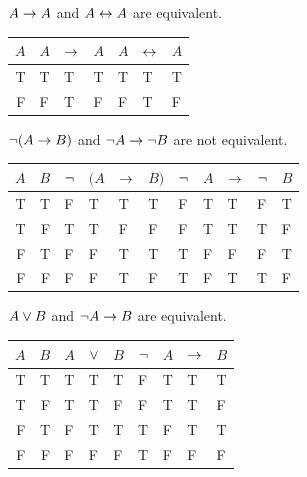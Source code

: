\begin{earg}
\item $A\rightarrow A$ and $A \leftrightarrow A$ are equivalent.
\begin{flushleft}
\begin{tabular}{d | f e h | f e e}
$A$ & $A$ & $\rightarrow$ & $A$ & $A$ & $\leftrightarrow$ & $A$\\
\hline
T &    T & T & T &      T & T &  T\Tstrut\\ 
F &    F & T & F &      F & T &  F 
\end{tabular}
\end{flushleft}\medskip

\newpage

\item ${\neg}(A \rightarrow B)$ and ${\neg} A \rightarrow {\neg} B$ are not equivalent.
\begin{flushleft}
\begin{tabular}{d d | f e e h | f e e e e}
$A$ & $B$ & ${\neg}$ & $(A$ & $\rightarrow$ & $B)$ & ${\neg}$ & $A$ & $\rightarrow$ & ${\neg}$ & $B$\\
\hline
T & T &  F &   T & T & T &     F & T & T & F & T\Tstrut\\ 
T & F &  T &   T & F & F &     F & T & T & T & F\\
F & T &  F &   F & T & T &     T & F & F & F & T\\
F & F &  F &   F & T & F &     T & F & T & T & F

\end{tabular}
\end{flushleft}\medskip


\item $A \vee B$ and ${\neg} A \rightarrow B$ are equivalent.
\begin{flushleft}
\begin{tabular}{d d | f e h | f e e e}
$A$ & $B$ & $A$ & $\vee$ & $B$ & ${\neg}$ & $A$ & $\rightarrow$ & $B$\\
\hline
T & T &    T & T & T &     F & T & T & T\Tstrut\\
T & F &    T & T & F &     F & T & T & F\\
F & T &    F & T & T &     T & F & T & T\\
F & F &    F & F & F &     T & F & F & F 
\end{tabular}
\end{flushleft}\medskip


\end{earg}
